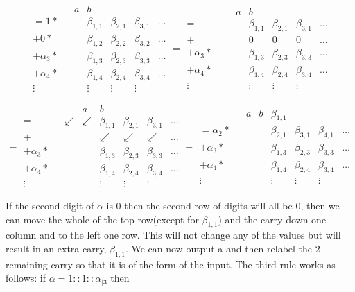 \documentclass{cs4rep}
\begin{document}
\[ \begin{array}{lcc|ccccc}
& & a & b \\
= 1 * & & & \beta_{1,1} & \beta_{2,1} & \beta_{3,1} & \ldots \\
+ 0 * & & & \beta_{1,2} & \beta_{2,2} & \beta_{3,2} & \ldots \\
+ \alpha_{3} * & & & \beta_{1,3} & \beta_{2,3} & \beta_{3,3} & \ldots \\
+ \alpha_{4} * & & & \beta_{1,4} & \beta_{2,4} & \beta_{3,4} & \ldots \\
\vdots & & & \vdots & \vdots & \vdots
\end{array}
=
\begin{array}{lccc|cccc}
& & & a & b \\
= & & & & \beta_{1,1} & \beta_{2,1} & \beta_{3,1} & \ldots \\
+ & & & & 0 & 0 & 0 & \ldots \\
+ \alpha_{3} * & & & & \beta_{1,3} & \beta_{2,3} & \beta_{3,3} & \ldots \\
+ \alpha_{4} * & & & & \beta_{1,4} & \beta_{2,4} & \beta_{3,4} & \ldots \\
\vdots & & & & \vdots & \vdots & \vdots
\end{array} 
\]

\[ = \begin{array}{lccc|cccc}
& & & a & b \\
= & & \swarrow & \swarrow & \beta_{1,1} & \beta_{2,1} & \beta_{3,1} & \ldots \\
+ & & & & \swarrow & \swarrow & \swarrow & \ldots \\
+ \alpha_{3} * & & & & \beta_{1,3} & \beta_{2,3} & \beta_{3,3} & \ldots \\
+ \alpha_{4} * & & & & \beta_{1,4} & \beta_{2,4} & \beta_{3,4} & \ldots \\
\vdots & & & & \vdots & \vdots & \vdots
\end{array} 
=
\begin{array}{lccc|cccc}
& & a & b & \beta_{1,1} \\
= \alpha_{2} * & & & & \beta_{2,1} & \beta_{3,1} & \beta_{4,1} & \ldots \\
+ \alpha_{3} * & & & & \beta_{1,3} & \beta_{2,3} & \beta_{3,3} & \ldots \\
+ \alpha_{4} * & & & & \beta_{1,4} & \beta_{2,4} & \beta_{3,4} & \ldots \\
\vdots & & & & \vdots & \vdots & \vdots
\end{array} 
\]

If the second digit of $\alpha$ is 0 then the second row of digits
will all be 0, then we can move the whole of the top row(except for
$\beta_{1,1}$) and the carry down one column and to the left one row.
This will not change any of the values but will result in an extra
carry, $\beta_{1,1}$. We can now output a and then relabel the 2
remaining carry so that it is of the form of the input. The third rule works as follows: if $ \alpha = 1 :: 1 :: \alpha_{|3} $ then
\end{document}
